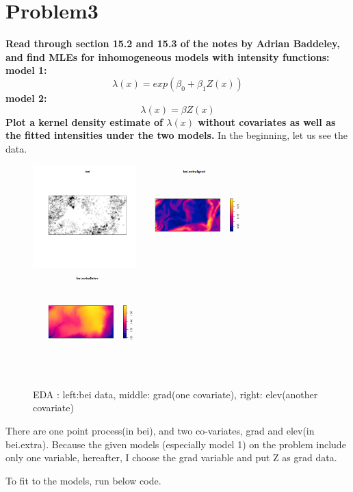 \documentclass{article}
\begin{document}
\section{Problem3}
\textbf{
Read through section 15.2 and 15.3 of the notes by Adrian Baddeley, and
find MLEs for inhomogeneous models with intensity functions:
model 1:
\[\lambda(x) = exp(\beta_0 + \beta_1 Z(x))\]
model 2:
\[\lambda(x) = \beta Z(x)\]
Plot a kernel density estimate of $\lambda(x)$ without covariates as well as the fitted intensities under the two models.
}
In the beginning, let us see the data.
\begin{figure}[!h]
    \centering
    \includegraphics[width=4cm]{prob3_bei.png}
    \includegraphics[width=4cm]{prob3_grad.png}
    \includegraphics[width=4cm]{prob3_elev.png}
    \caption{EDA : left:bei data, middle: grad(one covariate), right: elev(another covariate)}
\end{figure}

There are one point process(in bei), and two co-variates, grad and elev(in bei.extra).
Because the given models (especially model 1) on the problem include only one variable,
hereafter, I choose the grad variable and put Z as grad data.

To fit to the models, run below code.
\end{document}
